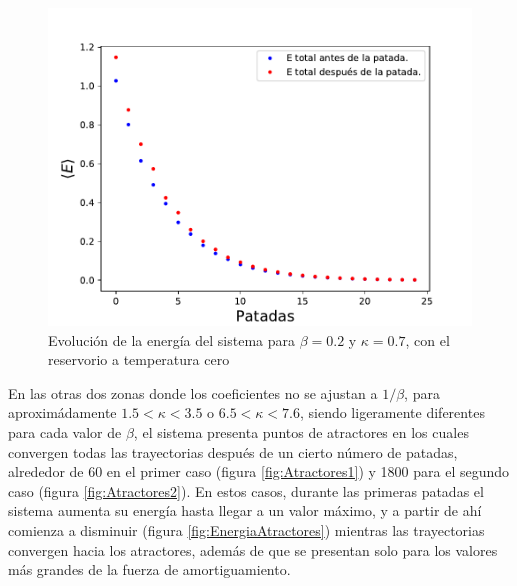 \documentclass[letterpaper,12pt,oneside]{book}
\begin{document}
\begin{figure}[h!]
	\centering
	\includegraphics[width=12cm]{Figs/EnergiaCaso1}
	\caption{Evolución de la energía del sistema para $\beta=0.2$ y $\kappa=0.7$, con el reservorio a temperatura cero}
	\label{fig:Caso1}
\end{figure}

En las otras dos zonas donde los coeficientes no se ajustan a $1/\beta$, para aproximádamente $1.5<\kappa<3.5$ o $6.5<\kappa<7.6$, siendo ligeramente diferentes para cada valor de $\beta$, el sistema presenta puntos de atractores en los cuales convergen todas las trayectorias después de un cierto número de patadas, alrededor de 60 en el primer caso (figura \ref{fig:Atractores1}) y 1800 para el segundo caso (figura \ref{fig:Atractores2}). En estos casos, durante las primeras patadas el sistema aumenta su energía hasta llegar a un valor máximo, y a partir de ahí comienza a disminuir (figura \ref{fig:EnergiaAtractores}) mientras las trayectorias convergen hacia los atractores, además de que se presentan solo para los valores más grandes de la fuerza de amortiguamiento.
\end{document}
